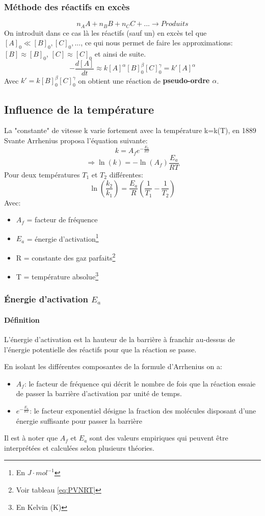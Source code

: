 \documentclass[10pt,a4paper]{book}
\begin{document}
\subsubsection{Méthode des réactifs en excès}
\[n_AA + n_BB + n_CC + ... \longrightarrow Produits\]
On introduit dans ce cas là les réactifs (sauf un) en excès tel que \([A]_0 \ll [B]_0, [C]_0, ...\), ce qui nous permet de faire les approximations: \([B] \approx [B]_0\), \([C] \approx [C]_0\) et ainsi de suite.
\[-\frac{d[A]}{dt} \approx k[A]^{\alpha}[B]^{\beta}_0[C]^{\gamma}_0 = k'[A]^{\alpha}\]
Avec \(k' = k[B]^{\beta}_0[C]^{\gamma}_0\) on obtient une réaction de \textbf{pseudo-ordre $\alpha$}.

\subsection{Influence de la température}

La "constante" de vitesse k varie fortement avec la température k=k(T), en 1889 Svante Arrhenius proposa l’équation suivante:
\[k = A_fe^{-\frac{E_a}{RT}}\]
\[\Rightarrow \ln(k) = -\ln(A_f)\frac{E_a}{RT}\]
Pour deux températures $T_1$ et $T_2$ différentes:
\[\ln\left(\frac{k_2}{k_1}\right) = \frac{E_a}{R}\left(\frac{1}{T_1}-\frac{1}{T_2}\right)\]
Avec:
\begin{itemize}
\item $A_f$ = facteur de fréquence
\item $E_a$ = énergie d'activation\footnote{En $J\cdot mol^{-1}$}
\item R = constante des gaz parfaits\footnote{Voir tableau \ref{eq:PVNRT}}
\item T = température absolue\footnote{En Kelvin (K)}
\end{itemize}

\subsubsection{Énergie d'activation \texorpdfstring{$E_a$}{Ea}}

\paragraph{Définition} L'énergie d’activation est la hauteur de la barrière à franchir au-dessus de l’énergie potentielle des réactifs pour que la réaction se passe. \par
En isolant les différentes composantes de la formule d'Arrhenius on a:
\begin{itemize}
\item $A_f$: le facteur de fréquence qui décrit le nombre de fois que la réaction essaie de passer la barrière d’activation par unité de temps.
\item \(e^{-\frac{E_a}{RT}}\): le facteur exponentiel désigne la fraction des molécules disposant d’une énergie suffisante pour passer la barrière
\end{itemize}
Il est à noter que $A_f$ et $E_a$ sont des valeurs empiriques qui peuvent être
interprétées et calculées selon plusieurs théories.
\end{document}
